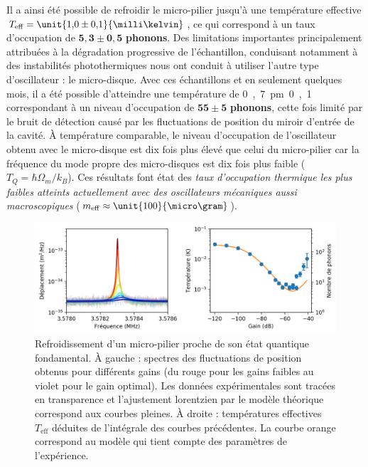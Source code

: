 \documentclass[12pt,a4paper]{article}
\begin{document}
Il a ainsi été possible de refroidir le micro-pilier jusqu'à une température effective $T_\mathrm{eff} = \unit{1{,}0\pm 0{,}1}{\milli\kelvin}$, ce qui correspond à un taux d'occupation de $\mathbf{5{,}3 \pm 0{,}5}$ \textbf{phonons}.
Des limitations importantes principalement attribuées à la dégradation progressive de l'échantillon, conduisant notamment à des instabilités photothermiques nous ont conduit à utiliser l'autre type d'oscillateur : le micro-disque.
Avec ces échantillons et en seulement quelques mois, il a été possible d'atteindre une température de \unit{0{,}7\pm 0{,}1}{\milli\kelvin} correspondant à un niveau d'occupation de $\mathbf{55\pm5}$ \textbf{phonons}, cette fois limité par le bruit de détection causé par les fluctuations de position du miroir d'entrée de la cavité.
À température comparable, le niveau d'occupation de l'oscillateur obtenu avec le micro-disque est dix fois plus élevé que celui du micro-pilier car la fréquence du mode propre des micro-disques est dix fois plus faible ($T_Q = \hbar\Omega_m/k_B$).
Ces résultats font état des \textit{taux d'occupation thermique les plus faibles atteints actuellement avec des oscillateurs mécaniques aussi macroscopiques} ($m_\mathrm{eff}\approx\unit{100}{\micro\gram}$). 

\begin{figure}
\center
\includegraphics[scale=0.75]{figures/feedback_cooling_6phonons.png}
\caption{Refroidissement d'un micro-pilier proche de son état quantique fondamental.
À gauche : spectres des fluctuations de position obtenus pour différents gains (du rouge pour les gains faibles au violet pour le gain optimal).
Les données expérimentales sont tracées en transparence et l'ajustement lorentzien par le modèle théorique correspond aux courbes pleines.
À droite : températures effectives $T_\mathrm{eff}$ déduites de l'intégrale des courbes précédentes.
La courbe orange correspond au modèle qui tient compte des paramètres de l'expérience.}
\label{fig:feedback_cooling_pillar}
\end{figure}
\end{document}
